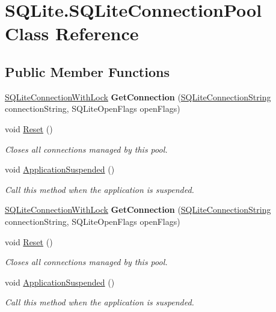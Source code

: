 \hypertarget{classSQLite_1_1SQLiteConnectionPool}{\section{S\-Q\-Lite.\-S\-Q\-Lite\-Connection\-Pool Class Reference}
\label{classSQLite_1_1SQLiteConnectionPool}
}
\subsection*{Public Member Functions}
\begin{DoxyCompactItemize}
\item 
\hypertarget{classSQLite_1_1SQLiteConnectionPool_a956aa90143a106ef4344ac2a77bfeefc}{\hyperlink{classSQLite_1_1SQLiteConnectionWithLock}{S\-Q\-Lite\-Connection\-With\-Lock} {\bfseries Get\-Connection} (\hyperlink{classSQLite_1_1SQLiteConnectionString}{S\-Q\-Lite\-Connection\-String} connection\-String, S\-Q\-Lite\-Open\-Flags open\-Flags)}\label{classSQLite_1_1SQLiteConnectionPool_a956aa90143a106ef4344ac2a77bfeefc}

\item 
void \hyperlink{classSQLite_1_1SQLiteConnectionPool_a06bf58eb2050f2bb058c5bbfe76fab5e}{Reset} ()
\begin{DoxyCompactList}\small\item\em Closes all connections managed by this pool. \end{DoxyCompactList}\item 
void \hyperlink{classSQLite_1_1SQLiteConnectionPool_a1ad83ea08efbe20c5f596d82977fffe9}{Application\-Suspended} ()
\begin{DoxyCompactList}\small\item\em Call this method when the application is suspended. \end{DoxyCompactList}\item 
\hypertarget{classSQLite_1_1SQLiteConnectionPool_a956aa90143a106ef4344ac2a77bfeefc}{\hyperlink{classSQLite_1_1SQLiteConnectionWithLock}{S\-Q\-Lite\-Connection\-With\-Lock} {\bfseries Get\-Connection} (\hyperlink{classSQLite_1_1SQLiteConnectionString}{S\-Q\-Lite\-Connection\-String} connection\-String, S\-Q\-Lite\-Open\-Flags open\-Flags)}\label{classSQLite_1_1SQLiteConnectionPool_a956aa90143a106ef4344ac2a77bfeefc}

\item 
void \hyperlink{classSQLite_1_1SQLiteConnectionPool_a06bf58eb2050f2bb058c5bbfe76fab5e}{Reset} ()
\begin{DoxyCompactList}\small\item\em Closes all connections managed by this pool. \end{DoxyCompactList}\item 
void \hyperlink{classSQLite_1_1SQLiteConnectionPool_a1ad83ea08efbe20c5f596d82977fffe9}{Application\-Suspended} ()
\begin{DoxyCompactList}\small\item\em Call this method when the application is suspended. \end{DoxyCompactList}\end{DoxyCompactItemize}
